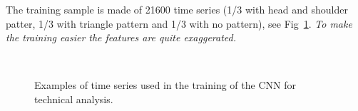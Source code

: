 The training sample is made of 21600 time series
(1/3 with head and shoulder patter, 1/3 with triangle pattern and 1/3
with no pattern), see Fig~\ref{fig:patterns}.
\emph{To make the training easier the features are quite exaggerated.}

\begin{figure}[htbp]
	\centering
	\\
	\caption{Examples of time series used in the training of the CNN for technical analysis.}
	\label{fig:patterns}
\end{figure}

